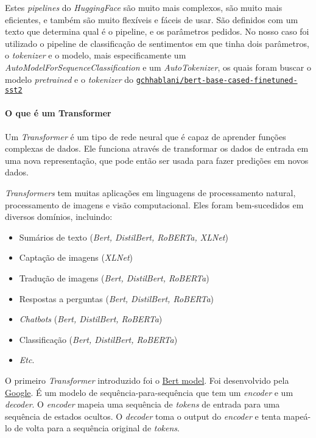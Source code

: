 Estes \textit{pipelines} do \textit{HuggingFace} são muito mais complexos, são muito mais eficientes, e também são muito flexíveis e fáceis de usar. São definidos com um texto que determina qual é o pipeline, e os parâmetros pedidos. No nosso caso foi utilizado o pipeline de classificação de sentimentos em que tinha dois parâmetros, o \textit{tokenizer} e o modelo, mais especificamente um \textit{AutoModelForSequenceClassification} e um \textit{AutoTokenizer}, os quais foram buscar o modelo \textit{pretrained} e o \textit{tokenizer} do \href{https://huggingface.co/gchhablani/bert-base-cased-finetuned-sst2}{\texttt{gchhablani/bert-base-cased-finetuned-sst2}}

\paragraph{O que é um Transformer\\}

Um \textit{Transformer} é um tipo de rede neural que é capaz de aprender funções complexas de dados. Ele funciona através de transformar os dados de entrada em uma nova representação, que pode então ser usada para fazer predições em novos dados.

\textit{Transformers} tem muitas aplicações em linguagens de processamento natural, processamento de imagens e visão computacional. Eles foram bem-sucedidos em diversos domínios, incluindo:

\begin{itemize}
    \item Sumários de texto (\textit{Bert, DistilBert, RoBERTa, XLNet})
    \item Captação de imagens (\textit{XLNet})
    \item Tradução de imagens (\textit{Bert, DistilBert, RoBERTa})
    \item Respostas a perguntas (\textit{Bert, DistilBert, RoBERTa})
    \item \textit{Chatbots} (\textit{Bert, DistilBert, RoBERTa})
    \item Classificação (\textit{Bert, DistilBert, RoBERTa})
    \item \textit{Etc}.
\end{itemize}

O primeiro \textit{Transformer} introduzido foi o \href{https://arxiv.org/abs/1810.04805}{Bert model}. Foi desenvolvido pela \href{https://www.google.com/}{Google}. É um modelo de sequência-para-sequência que tem um \textit{encoder} e um \textit{decoder}. O \textit{encoder} mapeia uma sequência de \textit{tokens} de entrada para uma sequência de estados ocultos. O \textit{decoder} toma o output do \textit{encoder} e tenta mapeá-lo de volta para a sequência original de \textit{tokens}.

